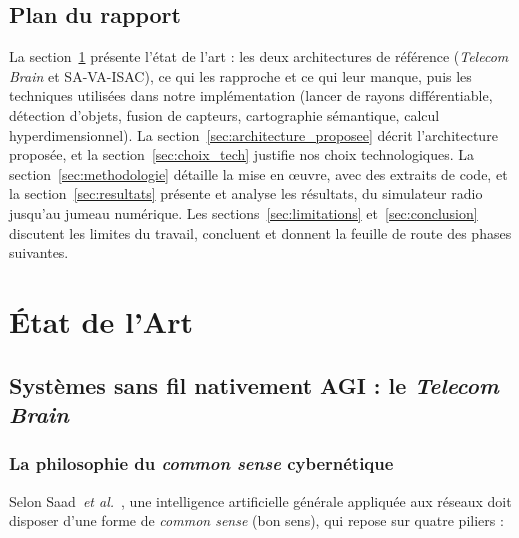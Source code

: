 \documentclass[12pt,a4paper,titlepage]{article}
\begin{document}
\subsection{Plan du rapport}

La section~\ref{sec:etat_art} présente l'état de l'art : les deux architectures de référence (\textit{Telecom Brain} et SA-VA-ISAC), ce qui les rapproche et ce qui leur manque, puis les techniques utilisées dans notre implémentation (lancer de rayons différentiable, détection d'objets, fusion de capteurs, cartographie sémantique, calcul hyperdimensionnel). La section~\ref{sec:architecture_proposee} décrit l'architecture proposée, et la section~\ref{sec:choix_tech} justifie nos choix technologiques. La section~\ref{sec:methodologie} détaille la mise en \oe uvre, avec des extraits de code, et la section~\ref{sec:resultats} présente et analyse les résultats, du simulateur radio jusqu'au jumeau numérique. Les sections~\ref{sec:limitations} et~\ref{sec:conclusion} discutent les limites du travail, concluent et donnent la feuille de route des phases suivantes.

\section{État de l'Art}
\label{sec:etat_art}

\subsection{Systèmes sans fil nativement AGI : le \textit{Telecom Brain}}
\label{subsec:telecom_brain}

\subsubsection{La philosophie du \textit{common sense} cybernétique}

Selon Saad~\textit{et al.}~\cite{saad2025}, une intelligence artificielle générale appliquée aux réseaux doit disposer d'une forme de \textit{common sense} (bon sens), qui repose sur quatre piliers :
\end{document}
